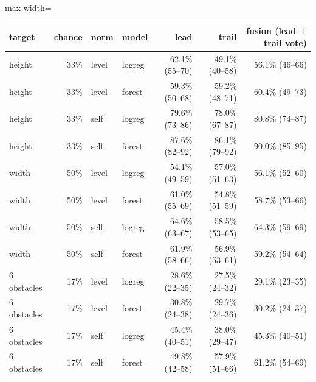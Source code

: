 \begin{adjustbox}{max width=\textwidth}
{\footnotesize
\begin{tabular}{lrllrrr}
\toprule
\textbf{target} & \textbf{chance} & \textbf{norm} & \textbf{model} & \textbf{lead} & \textbf{trail} & \textbf{fusion (lead + trail vote)} \\
\midrule
height & 33\% & level & logreg & 62.1\% (55--70) & 49.1\% (40--58) & 56.1\% (46--66) \\
height & 33\% & level & forest & 59.3\% (50--68) & 59.2\% (48--71) & 60.4\% (49--73) \\
height & 33\% & self & logreg & 79.6\% (73--86) & 78.0\% (67--87) & 80.8\% (74--87) \\
height & 33\% & self & forest & 87.6\% (82--92) & 86.1\% (79--92) & 90.0\% (85--95) \\
width & 50\% & level & logreg & 54.1\% (49--59) & 57.0\% (51--63) & 56.1\% (52--60) \\
width & 50\% & level & forest & 61.0\% (55--69) & 54.8\% (51--59) & 58.7\% (53--66) \\
width & 50\% & self & logreg & 64.6\% (63--67) & 58.5\% (53--65) & 64.3\% (59--69) \\
width & 50\% & self & forest & 61.9\% (58--66) & 56.9\% (53--61) & 59.2\% (54--64) \\
6 obstacles & 17\% & level & logreg & 28.6\% (22--35) & 27.5\% (24--32) & 29.1\% (23--35) \\
6 obstacles & 17\% & level & forest & 30.8\% (24--38) & 29.7\% (24--36) & 30.2\% (24--37) \\
6 obstacles & 17\% & self & logreg & 45.4\% (40--51) & 38.0\% (29--47) & 45.3\% (40--51) \\
6 obstacles & 17\% & self & forest & 49.8\% (42--58) & 57.9\% (51--66) & 61.2\% (54--69) \\
\bottomrule
\end{tabular}
}
\end{adjustbox}

